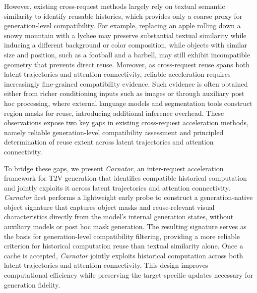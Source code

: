 However, existing cross-request methods largely rely on textual semantic similarity to identify reusable histories, which provides only a coarse proxy for generation-level compatibility.
For example, replacing an apple rolling down a snowy mountain with a lychee may preserve substantial textual similarity while inducing a different background or color composition, while objects with similar size and position, such as a football and a barbell, may still exhibit incompatible geometry that prevents direct reuse.
Moreover, as cross-request reuse spans both latent trajectories and attention connectivity, reliable acceleration requires increasingly fine-grained compatibility evidence.
Such evidence is often obtained either from richer conditioning inputs such as images or through auxiliary post hoc processing, where external language models and segmentation tools construct region masks for reuse, introducing additional inference overhead.
These observations expose two key gaps in existing cross-request acceleration methods, namely reliable generation-level compatibility assessment and principled determination of reuse extent across latent trajectories and attention connectivity.

To bridge these gaps, we present \emph{Carnator}, an inter-request acceleration framework for T2V generation that identifies compatible historical computation and jointly exploits it across latent trajectories and attention connectivity.
\emph{Carnator} first performs a lightweight early probe to construct a generation-native object signature that captures object masks and reuse-relevant visual characteristics directly from the model’s internal generation states, without auxiliary models or post hoc mask generation.
The resulting signature serves as the basis for generation-level compatibility filtering, providing a more reliable criterion for historical computation reuse than textual similarity alone.
Once a cache is accepted, \emph{Carnator} jointly exploits historical computation across both latent trajectories and attention connectivity.
This design improves computational efficiency while preserving the target-specific updates necessary for generation fidelity.

